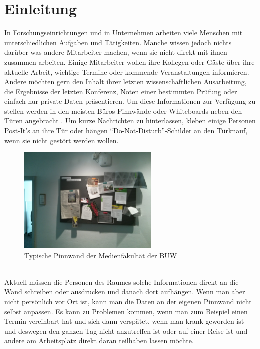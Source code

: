 \chapter{Einleitung}\label{Einleitung}
In Forschungseinrichtungen und in Unternehmen arbeiten viele Menschen mit unterschiedlichen Aufgaben und Tätigkeiten.
Manche wissen jedoch nichts darüber was andere Mitarbeiter machen, wenn sie nicht direkt mit ihnen zusammen arbeiten.
Einige Mitarbeiter wollen ihre Kollegen oder Gäste über ihre aktuelle Arbeit, wichtige Termine oder kommende Veranstaltungen informieren.
Andere möchten gern den Inhalt ihrer letzten wissenschaftlichen Ausarbeitung, die Ergebnisse der letzten Konferenz, Noten einer bestimmten Prüfung oder einfach nur private Daten präsentieren.
Um diese Informationen zur Verfügung zu stellen werden in den meisten Büros Pinnwände oder Whiteboards neben den Türen angebracht . Um kurze Nachrichten zu hinterlassen, kleben einige Personen Post-It's an ihre Tür oder hängen ``Do-Not-Disturb''-Schilder an den Türknauf, wenn sie nicht gestört werden wollen.
\\
\begin{figure}[h!]
  \centering
    \includegraphics[width=0.6\textwidth]{./img/pinnwand.jpg}
  \caption{Typische Pinnwand der Medienfakultät der BUW}
  \label{img:pinnwand}
\end{figure}
\\
Aktuell müssen die Personen des Raumes solche Informationen direkt an die Wand schreiben oder ausdrucken und danach dort aufhängen.
Wenn man aber nicht persönlich vor Ort ist, kann man die Daten an der eigenen Pinnwand nicht selbst anpassen.
Es kann zu Problemen kommen, wenn man zum Beispiel einen Termin vereinbart hat und sich dann verspätet, wenn man krank geworden ist und deswegen den ganzen Tag nicht anzutreffen ist oder auf einer Reise ist und andere am Arbeitsplatz direkt daran teilhaben lassen möchte.
\\
